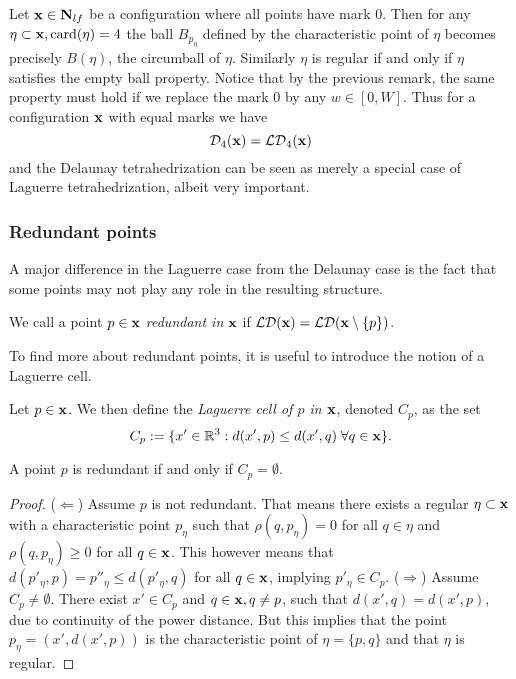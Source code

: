 \begin{remark}\label{rem:LaguerreToDelaunay}
	Let ${\mathbf{x}} \in \mathbf N_{lf}$ be a configuration where all points have mark $0$. Then for any $\eta \subset {\mathbf{x}}, \mathrm{card}(\eta)=4$ the ball $B_{p_\eta}$ defined by the characteristic point of $\eta$ becomes precisely $B(\eta)$, the circumball of $\eta$. Similarly $\eta$ is regular if and only if $\eta$ satisfies the empty ball property. Notice that by the previous remark, the same property must hold if we replace the mark $0$ by any $w\in[0,W]$. Thus for a configuration ${\mathbf{x}}$ with equal marks we have 
	$$\mathcal D_4({\mathbf{x}})=\mathcal {LD}_4({\mathbf{x}})$$ 
	and the Delaunay tetrahedrization can be seen as merely a special case of Laguerre tetrahedrization, albeit very important.
\end{remark}


\subsubsection{Redundant points}\label{sec:redundant}

A major difference in the Laguerre case from the Delaunay case is the fact that some points may not play any role in the resulting structure.

\begin{definition}
	We call a point $p \in {\mathbf{x}}$ \textit{redundant in} ${\mathbf{x}}$ if $\mathcal {LD}({\mathbf{x}}) = \mathcal {LD}({\mathbf{x}} \setminus \{p\})$.
\end{definition}

To find more about redundant points, it is useful to introduce the notion of a Laguerre cell.

\begin{definition}
Let $p\in {\mathbf{x}}$. We then define the \textit{Laguerre cell of $p$ in ${\mathbf{x}}$}, denoted $C_p$, as the set
$$C_p := \{x' \in {\mathbb R^3}: d(x',p) \leq d(x',q) \; \forall q \in {\mathbf{x}}\}.$$ 
\end{definition}

\begin{proposition}
	A point $p$ is redundant if and only if $C_p=\emptyset$.
\end{proposition}
\begin{proof}
	($\Leftarrow$) Assume $p$ is not redundant. That means there exists a regular $\eta\subset {\mathbf{x}}$ with a characteristic point $p_\eta$ such that $\rho(q,p_\eta)=0$ for all $q\in\eta$ and $\rho(q,p_\eta)\geq 0$ for all $q\in {\mathbf{x}}$. This however means that $d(p'_\eta,p) = p''_\eta \leq d(p'_\eta,q)$ for all $q\in{\mathbf{x}}$, implying $p'_\eta \in C_p$. \newline
	($\Rightarrow$) Assume $C_p \neq \emptyset$. There exist $x' \in C_p$ and $q\in{\mathbf{x}}, q\neq p$, such that $d(x',q)=d(x',p)$, due to continuity of the power distance. But this implies that the point $p_\eta = (x', d(x',p))$ is the characteristic point of $\eta=\{p,q\}$ and that $\eta$ is regular.
\end{proof}

